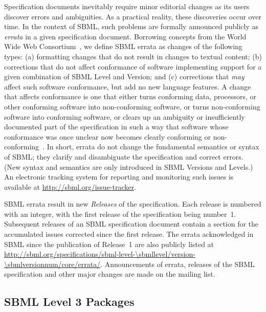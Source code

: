 Specification documents inevitably require minor editorial changes
as its users discover errors and ambiguities.  As a practical
reality, these discoveries occur over time.  In the context of
SBML, such problems are formally announced publicly as
\emph{errata} in a given specification document.  Borrowing
concepts from the World Wide Web Consortium~\citep{jacobs:2004},
we define SBML errata as changes of the following types: (a)
formatting changes that do not result in changes to textual
content; (b) corrections that do not affect conformance of
software implementing support for a given combination of SBML
Level and Version; and (c) corrections that \emph{may} affect such
software conformance, but add no new language features.  A change
that affects conformance is one that either turns conforming data,
processors, or other conforming software into non-conforming
software, or turns non-conforming software into conforming
software, or clears up an ambiguity or insufficiently documented
part of the specification in such a way that software whose
conformance was once unclear now becomes clearly conforming or
non-conforming~\citep{jacobs:2004}.  In short, errata do not
change the fundamental semantics or syntax of SBML; they clarify
and disambiguate the specification and correct errors.  (New
syntax and semantics are only introduced in SBML Versions and
Levels.)  An electronic tracking system for reporting and
monitoring such issues is available at
\url{http://sbml.org/issue-tracker}.

SBML errata result in new \emph{Releases} of the specification.
Each release is numbered with an integer, with the first release
of the specification being number~1.  Subsequent releases of an
SBML specification document contain a section for the accumulated
issues corrected since the first release.  The errata acknowledged
in SBML \thisLV since the publication of Release~1 are also
publicly listed at
\url{http://sbml.org/specifications/sbml-level-\sbmllevel/version-\sbmlversionnum/core/errata/}.
Announcements of errata, releases of the SBML specification and
other major changes are made on the
 mailing
list.


\subsection{SBML Level 3 Packages}
\label{sec:packages}

